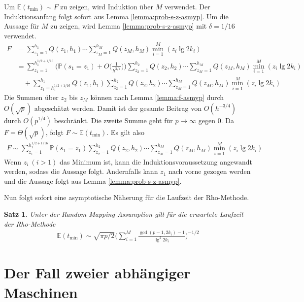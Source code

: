 \documentclass[a4paper, 11pt, ngerman]{article}
\newcommand{\E}{\mathbb{E}}
\renewcommand{\P}{\mathbb{P}}
\theoremstyle{definition}
\theoremstyle{plain}
\newtheorem{theorem}{Satz}
\theoremstyle{remark}
\begin{document}
Um $\E(t_{\min}) \sim F$ zu zeigen, wird Induktion über $M$ verwendet. Der Induktionsanfang folgt sofort aus Lemma \ref{lemma:prob-s-z-asmyp}. Um die Aussage für $M$ zu zeigen, wird Lemma \ref{lemma:prob-s-z-asmyp} mit $\delta = 1/16$ verwendet.
\begin{align*}
    F & = \sum_{z_1 = 1}^{h_1} Q(z_1, h_1) \cdots
    \sum_{z_M = 1}^{h_M} Q(z_M, h_M)
    \min_{i = 1}^M(z_i \lg 2k_i)                  \\
      & = \sum_{z_1 = 1}^{h_1^{1/2 + 1/16}}
    \Bigg (\P(s_1 = z_1) + O \bigg (\frac 1 {h^{3/4}} \bigg ) \Bigg )
    \sum_{z_2 = 1}^{h_2} Q(z_2, h_2) \cdots
    \sum_{z_M = 1}^{h_M} Q(z_M, h_M)
    \min_{i = 1}^M(z_i \lg 2k_i)                  \\
      & \quad +
    \sum_{z_1 = h_1^{1/2 + 1/16}}^{h_1} Q(z_1, h_1)
    \sum_{z_2 = 1}^{h_2} Q(z_2, h_2) \cdots
    \sum_{z_M = 1}^{h_M} Q(z_M, h_M)
    \min_{i = 1}^M(z_i \lg 2k_i)
\end{align*}
Die Summen über $z_2$ bis $z_M$ können nach Lemma \ref{lemma:f-asmyp} durch $O(\sqrt p)$ abgeschätzt werden. Damit ist der gesamte Beitrag von $O(h^{-3/4})$ durch $O(p^{1/4})$ beschränkt. Die zweite Summe geht für $p \to \infty$ gegen 0. Da $F = \Theta(\sqrt p)$, folgt $F \sim \E(t_{\min})$. Es gilt also
\begin{align*}
    F \sim
    \sum_{z_1 = 1}^{h_1^{1/2 + 1/16}} \P(s_1 = z_1)
    \sum_{z_2 = 1}^{h_2} Q(z_2, h_2) \cdots
    \sum_{z_M = 1}^{h_M} Q(z_M, h_M)
    \min_{i = 1}^M(z_i \lg 2k_i)
\end{align*}
Wenn $z_i \ (i > 1)$ das Minimum ist, kann die Induktionsvoraussetzung angewandt werden, sodass die Aussage folgt. Andernfalls kann $z_1$ nach vorne gezogen werden und die Aussage folgt aus Lemma \ref{lemma:prob-s-z-asmyp}.

Nun folgt sofort eine asymptotische Näherung für die Laufzeit der Rho-Methode.
\begin{theorem}
    Unter der Random Mapping Assumption gilt für die erwartete Laufzeit der Rho-Methode
    \begin{align*}
        \E(t_{\min}) \sim
        \sqrt{\pi p / 2} \Bigg ( \sum_{i = 1}^M
        \frac {\gcd(p - 1, 2k_i) - 1} {\lg^2 2k_i} \Bigg )^{-1/2}
    \end{align*}
\end{theorem}


\section{Der Fall zweier abhängiger Maschinen}
\label{sec:dep-machines}
\end{document}
